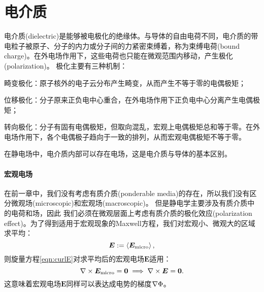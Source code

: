 \section{电介质}
\label{sec:dielectric}

电介质(dielectric)是能够被电极化的绝缘体。与导体的自由电荷不同，电介质的带电粒子被原子、分子的内力或分子间的力紧密束缚着，称为束缚电荷(bound charge)。在外电场作用下，这些电荷也只能在微观范围内移动，产生极化(polarization)。
极化主要有三种机制：
\begin{compactenum}
    \item 畸变极化：原子核外的电子云分布产生畸变，从而产生不等于零的电偶极矩；
    \item 位移极化：分子原来正负电中心重合，在外电场作用下正负电中心分离产生电偶极矩；
    \item 转向极化：分子有固有电偶极矩，但取向混乱，宏观上电偶极矩总和等于零。在外电场作用下，各个电偶极子趋向于一致的排列，从而宏观电偶极矩不等于零。
\end{compactenum}
在静电场中，电介质内部可以存在电场，这是电介质与导体的基本区别。
\paragraph{宏观电场}
在前一章中，我们没有考虑有质介质(ponderable media)的存在，所以我们没有区分微观场(microscopic)和宏观场(macroscopic)。
但是静电学主要涉及有质介质中的电荷和场，因此%
我们必须在微观层面上考虑有质介质的极化效应(polarization effect)。为了得到适用于宏观现象的Maxwell方程，我们对宏观小、微观大的区域求平均：%
\[
    \bm E:=\left\langle \bm E_\text{micro}\right\rangle,
\]
则旋量方程\eqref{eqn:curlE}对求平均后的宏观电场$\bm E$适用：
\begin{equation}
    \label{eqn:curlE-macro}
    \nabla\times\bm E_\text{micro}=\bm 0\implies\nabla\times\bm E=\bm 0.
\end{equation}
这意味着宏观电场$\bm E$同样可以表达成电势的梯度$\nabla\Phi$。

